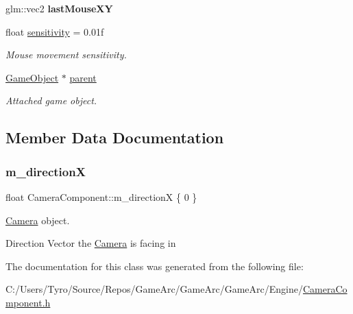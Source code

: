 \begin{DoxyCompactItemize}
\mbox{\label{class_camera_component_aef5b26e5e9b68eab4efec97b74c11b13}} 
glm\+::vec2 {\bfseries last\+Mouse\+XY}
\item 
\mbox{\label{class_camera_component_acaa50f9d7c6df9e3c18dad170a1298fc}} 
float \mbox{\hyperlink{class_camera_component_acaa50f9d7c6df9e3c18dad170a1298fc}{sensitivity}} = 0.\+01f
\begin{DoxyCompactList}\small\item\em Mouse movement sensitivity. \end{DoxyCompactList}\item 
\mbox{\label{class_camera_component_ae70994c6a86c59b0e6ab7482eb2cd403}} 
\mbox{\hyperlink{class_game_object}{Game\+Object}} $\ast$ \mbox{\hyperlink{class_camera_component_ae70994c6a86c59b0e6ab7482eb2cd403}{parent}}
\begin{DoxyCompactList}\small\item\em Attached game object. \end{DoxyCompactList}\end{DoxyCompactItemize}


\subsection{Member Data Documentation}
\mbox{\label{class_camera_component_a7a95ace18cee6a6b88ac5873233e2cc3}} 
\subsubsection{\texorpdfstring{m\_directionX}{m\_directionX}}
{\footnotesize\ttfamily float Camera\+Component\+::m\+\_\+directionX \{ 0 \}}



\mbox{\hyperlink{class_camera}{Camera}} object. 

Direction Vector the \mbox{\hyperlink{class_camera}{Camera}} is facing in 

The documentation for this class was generated from the following file\+:\begin{DoxyCompactItemize}
\item 
C\+:/\+Users/\+Tyro/\+Source/\+Repos/\+Game\+Arc/\+Game\+Arc/\+Game\+Arc/\+Engine/\mbox{\hyperlink{_camera_component_8h}{Camera\+Component.\+h}}\end{DoxyCompactItemize}
